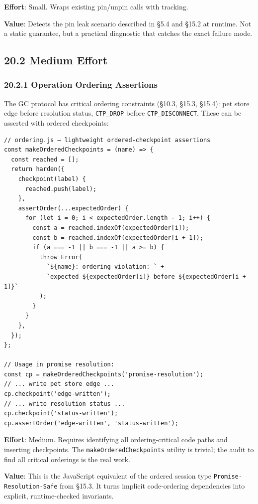 \documentclass[11pt]{article}
\begin{document}
\textbf{Effort}: Small. Wraps existing pin/unpin calls with tracking.

\textbf{Value}: Detects the pin leak scenario described in §5.4 and §15.2 at
runtime. Not a static guarantee, but a practical diagnostic that catches
the exact failure mode.
\subsection{20.2 Medium Effort}
\label{sec:org97014b1}

\subsubsection{20.2.1 Operation Ordering Assertions}
\label{sec:orga1b9021}

The GC protocol has critical ordering constraints (§10.3, §15.3, §15.4):
pet store edge before resolution status, \texttt{CTP\_DROP} before
\texttt{CTP\_DISCONNECT}. These can be asserted with ordered checkpoints:

\begin{verbatim}
// ordering.js — lightweight ordered-checkpoint assertions
const makeOrderedCheckpoints = (name) => {
  const reached = [];
  return harden({
    checkpoint(label) {
      reached.push(label);
    },
    assertOrder(...expectedOrder) {
      for (let i = 0; i < expectedOrder.length - 1; i++) {
        const a = reached.indexOf(expectedOrder[i]);
        const b = reached.indexOf(expectedOrder[i + 1]);
        if (a === -1 || b === -1 || a >= b) {
          throw Error(
            `${name}: ordering violation: ` +
            `expected ${expectedOrder[i]} before ${expectedOrder[i + 1]}`
          );
        }
      }
    },
  });
};

// Usage in promise resolution:
const cp = makeOrderedCheckpoints('promise-resolution');
// ... write pet store edge ...
cp.checkpoint('edge-written');
// ... write resolution status ...
cp.checkpoint('status-written');
cp.assertOrder('edge-written', 'status-written');
\end{verbatim}

\textbf{Effort}: Medium. Requires identifying all ordering-critical code paths
and inserting checkpoints. The \texttt{makeOrderedCheckpoints} utility is trivial;
the audit to find all critical orderings is the real work.

\textbf{Value}: This is the JavaScript equivalent of the ordered session type
\texttt{Promise-Resolution-Safe} from §15.3. It turns implicit code-ordering
dependencies into explicit, runtime-checked invariants.
\end{document}

